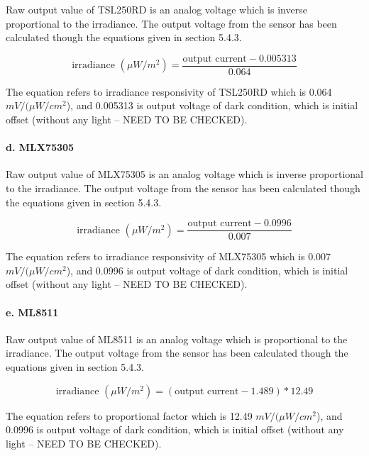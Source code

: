 Raw output value of TSL250RD is an analog voltage which is inverse proportional to the irradiance. The output voltage from the sensor has been calculated though the equations given in section 5.4.3.

{\centering
 \[ \text{irradiance } (\mu W/m^2) = \frac{\text{output current} - 0.005313}{0.064} \]
 \par
 }
 
 \bigbreak
 The equation refers to irradiance responsivity of TSL250RD which is 0.064 \(mV/(\mu W/cm^2\)), and 0.005313 is output voltage of dark condition, which is initial offset (without any light -- NEED TO BE CHECKED).

\paragraph{d. MLX75305}

Raw output value of MLX75305 is an analog voltage which is inverse proportional to the irradiance. The output voltage from the sensor has been calculated though the equations given in section 5.4.3.

{\centering
 \[ \text{irradiance } (\mu W/m^2) = \frac{\text{output current} - 0.0996}{0.007} \]
 \par
 }
 
 \bigbreak
 The equation refers to irradiance responsivity of MLX75305 which is 0.007 \(mV/(\mu W/cm^2\)), and 0.0996 is output voltage of dark condition, which is initial offset (without any light -- NEED TO BE CHECKED).

\paragraph{e. ML8511}

Raw output value of ML8511 is an analog voltage which is proportional to the irradiance. The output voltage from the sensor has been calculated though the equations given in section 5.4.3.

{\centering
 \[ \text{irradiance } (\mu W/m^2) = (\text{output current} - 1.489) * 12.49 \]
 \par
 }
 
 \bigbreak
 The equation refers to proportional factor which is 12.49 \(mV/(\mu W/cm^2\)), and 0.0996 is output voltage of dark condition, which is initial offset (without any light -- NEED TO BE CHECKED).


